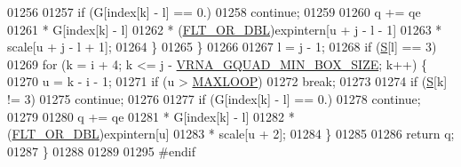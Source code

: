 \begin{DoxyCode}
01256 
01257       \textcolor{keywordflow}{if} (G[index[k] - l] == 0.)
01258         \textcolor{keywordflow}{continue};
01259 
01260       q += qe
01261            * G[index[k] - l]
01262            * (\mbox{\hyperlink{group__data__structures_ga31125aeace516926bf7f251f759b6126}{FLT\_OR\_DBL}})expintern[u + j - l - 1]
01263            * scale[u + j - l + 1];
01264     \}
01265   \}
01266 
01267   l = j - 1;
01268   \textcolor{keywordflow}{if} (\mbox{\hyperlink{group__energy__parameters__rw_gga7bf2bb363bcf5ce50d60255d256e5682af1ce01387d2348f8b858721a7db81670}{S}}[l] == 3)
01269     \textcolor{keywordflow}{for} (k = i + 4; k <= j - \mbox{\hyperlink{group__energy__parameters_gad7bdd880afca461f97763d79ee57a347}{VRNA\_GQUAD\_MIN\_BOX\_SIZE}}; k++) \{
01270       u = k - i - 1;
01271       \textcolor{keywordflow}{if} (u > \mbox{\hyperlink{energy__const_8h_ad1bd6eabac419670ddd3c9ed82145988}{MAXLOOP}})
01272         \textcolor{keywordflow}{break};
01273 
01274       \textcolor{keywordflow}{if} (\mbox{\hyperlink{group__energy__parameters__rw_gga7bf2bb363bcf5ce50d60255d256e5682af1ce01387d2348f8b858721a7db81670}{S}}[k] != 3)
01275         \textcolor{keywordflow}{continue};
01276 
01277       \textcolor{keywordflow}{if} (G[index[k] - l] == 0.)
01278         \textcolor{keywordflow}{continue};
01279 
01280       q += qe
01281            * G[index[k] - l]
01282            * (\mbox{\hyperlink{group__data__structures_ga31125aeace516926bf7f251f759b6126}{FLT\_OR\_DBL}})expintern[u]
01283            * scale[u + 2];
01284     \}
01285 
01286   \textcolor{keywordflow}{return} q;
01287 \}
01288 
01289 
01295 \textcolor{preprocessor}{#endif}
\end{DoxyCode}
